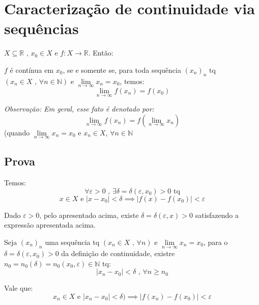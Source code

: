 \documentclass[12pt]{article}
\begin{document}
    \section*{Caracterização de continuidade via sequências }

    $X \subseteq \mathbb{R} \text{ , } x_0 \in X \text{ e } f: X \to \mathbb{R}$. Então:

    $f$ é contínua em $x_0$, se e somente se, para toda sequência $(x_n)_n$ tq $\left(x_n \in X \text{ , } \forall n \in \mathbb{N}\right)$ e $\lim \limits_{n \to \infty} x_n = x_0$, temos:
    \begin{equation*}
        \lim \limits_{n \to \infty} f(x_n) = f(x_0)
    \end{equation*}

   \textit{Observação: Em geral, esse fato é denotado por:}
    \begin{equation*}
        \lim_{n \to \infty} f(x_n) = f \left( \lim_{n \to \infty} x_n \right)
    \end{equation*}
    (quando $\lim \limits_{n \to \infty} x_n = x_0$ e $x_n \in X$, $\forall n \in \mathbb{N}$

    \subsection*{Prova}
    Temos:
    \begin{equation*}
        \forall \varepsilon > 0 \text{ , } \exists \delta = \delta(\varepsilon, x_0) > 0 \text{ tq}
     \end{equation*}
     \begin{equation*}
         x \in X \text{ e } |x - x_0| < \delta \implies |f(x) - f(x_0)| < \varepsilon
     \end{equation*}

     Dado $\varepsilon > 0$, pelo apresentado acima, existe $\delta = \delta(\varepsilon, x) > 0$ satisfazendo a expressão apresentada acima.

     Seja $(x_n)_n$ uma sequência tq $(x_n \in X \text{ , } \forall n)$ e $\lim \limits_{n \to \infty} x_n = x_0$, para o $\delta = \delta( \varepsilon, x_0) > 0$ da definição de continuidade, existre $n_0 = n_0(\delta) = n_0(x_0, \varepsilon) \in \mathbb{N}$ tq:
     \begin{equation*}
         |x_n - x_0| < \delta \text{ , } \forall n \geq n_0
     \end{equation*}

     Vale que:
     \begin{equation*}
         x_n \in X \text{ e } |x_n - x_0| < \delta) \implies |f(x_n) - f(x_0)| < \varepsilon
     \end{equation*}
\end{document}
